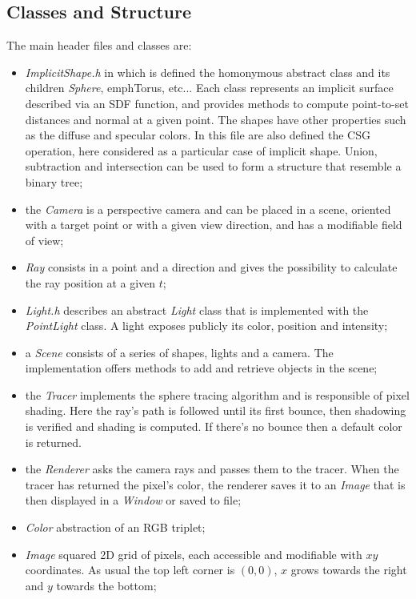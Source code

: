 \subsection{Classes and Structure}
The main header files and classes are:
\begin{itemize}
  \item \emph{ImplicitShape.h} in which is defined the homonymous abstract class and its children \emph{Sphere}, emph{Torus}, etc...
    Each class represents an implicit surface described via an SDF function, and provides methods to compute point-to-set distances and normal at a given point.
    The shapes have other properties such as the diffuse and specular colors.
    In this file are also defined the CSG operation, here considered as a particular case of implicit shape.
   Union, subtraction and intersection can be used to form a structure that resemble a binary tree;

  \item the \emph{Camera} is a perspective camera and can be placed in a scene, oriented with a target point or with a given view direction, and has a modifiable field of view;
  \item \emph{Ray} consists in a point and a direction and gives the possibility to calculate the ray position at a given $t$;

  \item \emph{Light.h} describes an abstract \emph{Light} class that is implemented with the \emph{PointLight} class.
    A light exposes publicly its color, position and intensity;

  \item a \emph{Scene} consists of a series of shapes, lights and a camera.
    The implementation offers methods to add and retrieve objects in the scene;

  \item the \emph{Tracer} implements the sphere tracing algorithm and is responsible of pixel shading.
    Here the ray's path is followed until its first bounce, then shadowing is verified and shading is computed.
    If there's no bounce then a default color is returned.

  \item the \emph{Renderer} asks the camera rays and passes them to the tracer.
    When the tracer has returned the pixel's color, the renderer saves it to an \emph{Image} that is then displayed in a \emph{Window} or saved to file;

  \item \emph{Color} abstraction of an RGB triplet;
  \item \emph{Image} squared 2D grid of pixels, each accessible and modifiable with $xy$ coordinates.
    As usual the top left corner is $(0,0)$, $x$ grows towards the right and $y$ towards the bottom;


\end{itemize}
